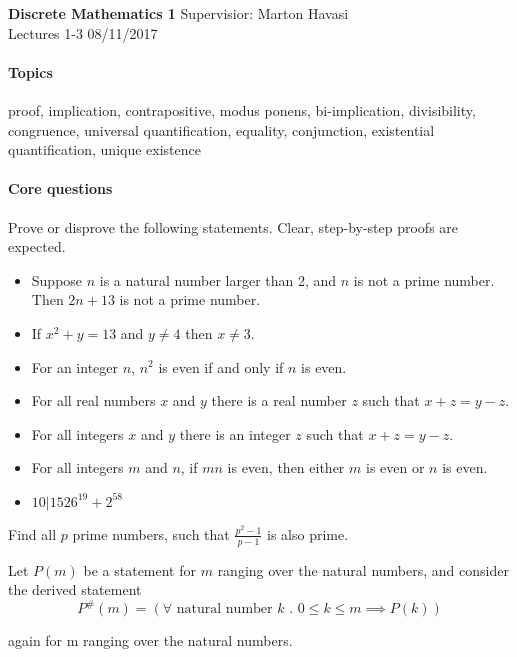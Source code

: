 \documentclass{exam}
\begin{document}
\noindent
\large\textbf{Discrete Mathematics 1} \hfill Supervisior: Marton Havasi \\
\normalsize Lectures 1-3 \hfill 08/11/2017
\paragraph{Topics}

proof, implication, contrapositive, modus ponens, bi-implication, divisibility, congruence, universal quantification, equality, conjunction, existential quantification, unique existence 

\paragraph{Core questions}
\begin{questions}
\question Prove or disprove the following statements. Clear, step-by-step proofs are expected.
\begin{itemize}
\item Suppose $n$ is a natural number larger than 2, and $n$ is not a prime number. Then $2n + 13$ is not a prime
number.

\item If $x^2+y = 13$ and $y\neq 4$ then $x\neq 3$.

\item For an integer $n$, $n^2$ is even if and only if $n$ is even.

\item For all real numbers $x$ and $y$ there is a real number $z$ such that $x + z = y - z$.

\item For all integers $x$ and $y$ there is an integer $z$ such that $x + z = y - z$.

\item For all integers $m$ and $n$, if $mn$ is even, then either $m$ is even or $n$ is even.

\item $10|1526^{19}+2^{58}$
\end{itemize}

\question Find all $p$ prime numbers, such that $\frac{p^2-1}{p-1}$ is also prime. 

\question Let $P(m)$ be a statement for $m$ ranging over the natural numbers, and consider the derived statement $$P^\#(m)=(\forall \text{ natural number } k \text{ . } 0 \leq k \leq m \implies P(k))$$ 

again for m ranging over the natural numbers.


\end{questions}
\end{document}
